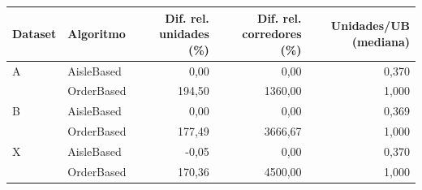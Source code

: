 \small
\begin{tabular}{llrrr}
\toprule
Dataset & Algoritmo & Dif. rel. unidades (\%) & Dif. rel. corredores (\%) & Unidades/UB (mediana) \\
\midrule
A & AisleBased & 0,00 & 0,00 & 0,370 \\
 & OrderBased & 194,50 & 1360,00 & 1,000 \\
B & AisleBased & 0,00 & 0,00 & 0,369 \\
 & OrderBased & 177,49 & 3666,67 & 1,000 \\
X & AisleBased & -0,05 & 0,00 & 0,370 \\
 & OrderBased & 170,36 & 4500,00 & 1,000 \\
\bottomrule
\end{tabular}

